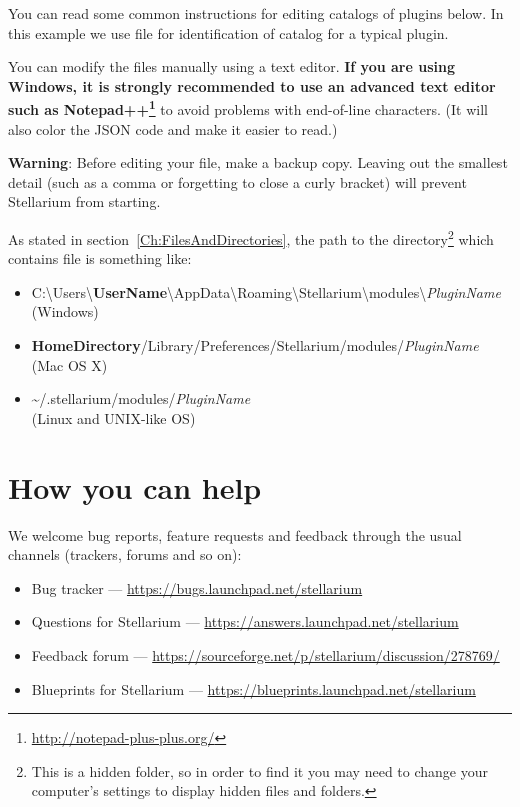 You can read some common instructions for editing catalogs of plugins
below. In this example we use file  for
identification of catalog for a typical plugin.

You can modify the  files manually using a text
editor. \textbf{If you are using Windows, it is strongly recommended to
use an advanced text editor such as
Notepad++\footnote{\url{http://notepad-plus-plus.org/}}} to avoid problems with
end-of-line characters. (It will also color the JSON code and make it
easier to read.)

\textbf{Warning}: Before editing your  file, make a
backup copy. Leaving out the smallest detail (such as a comma or
forgetting to close a curly bracket) will prevent Stellarium from
starting.

As stated in section~\ref{Ch:FilesAndDirectories}, the path to the
directory\footnote{This is a hidden folder, so in order to find it you
  may need to change your computer's settings to display hidden files
  and folders.} which contains  file is something
like:

\begin{itemize}
\item
  C:\textbackslash Users\textbackslash\textbf{UserName}\textbackslash AppData\textbackslash Roaming\textbackslash Stellarium\textbackslash modules\textbackslash \textit{PluginName}\\ (Windows)
\item
  \textbf{HomeDirectory}/Library/Preferences/Stellarium/modules/\textit{PluginName}\\ (Mac OS X)
\item
  \textasciitilde{}/.stellarium/modules/\textit{PluginName}\\ (Linux and UNIX-like OS)
\end{itemize}

\section{How you can help}
\label{sec:Plugins:HowYouCanHelp}

We welcome bug reports, feature requests and feedback through the
usual channels (trackers, forums and so on):
\begin{itemize}
\item Bug tracker --- \url{https://bugs.launchpad.net/stellarium}
\item Questions for Stellarium --- \url{https://answers.launchpad.net/stellarium}
\item Feedback forum --- \url{https://sourceforge.net/p/stellarium/discussion/278769/}
\item Blueprints for Stellarium --- \url{https://blueprints.launchpad.net/stellarium}
\end{itemize}


